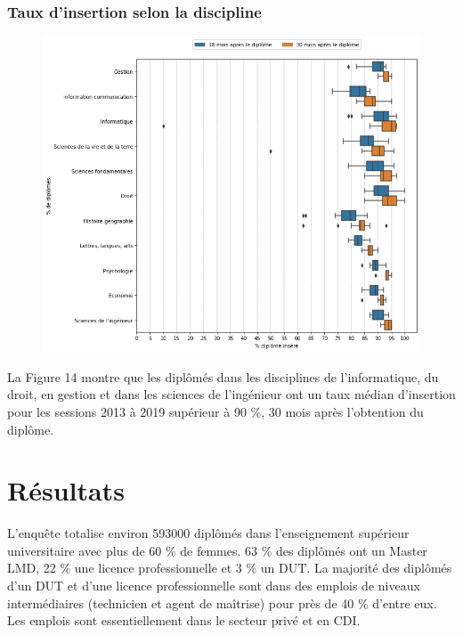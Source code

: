 \documentclass[12pt, a4paper, titlepage, table]{article}
\begin{document}
	\subsubsection{Taux d'insertion selon la discipline}
	
		\begin{figure}[H]
			\centering
			\includegraphics[width=1\textwidth]{../graphs/boxplot_insertion_discipline.png}
			\label{fig:boxplot_insertion_discipline}
		\end{figure}
		
	La Figure 14 montre que les diplômés dans les disciplines de l'informatique, du droit, en gestion et dans les sciences de l'ingénieur ont un taux médian d'insertion pour les sessions 2013 à 2019 supérieur à 90 \%, 30 mois après l'obtention du diplôme. 
	
\section{Résultats}
L'enquête totalise environ 593000 diplômés dans l'enseignement supérieur universitaire avec plus de 60 \% de femmes.
63 \% des diplômés ont un Master LMD, 22 \% une licence professionnelle et 3 \% un DUT.
La majorité des diplômés d'un DUT et d'une licence professionnelle sont dans des emplois de niveaux intermédiaires (technicien et agent de maîtrise) pour près de 40 \% d'entre eux. Les emplois sont essentiellement dans le secteur privé et en CDI.
\end{document}
